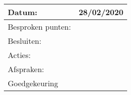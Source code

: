 \begin{tabularx}{\textwidth}{| l | X |}
  \hline
  Datum: & 28/02/2020\\
  \hline
  Besproken punten: & \\
  \hline
  Besluiten: & \\
  Acties: & \\
  Afspraken: & \\
  \hline
  Goedgekeuring & \\
  \hline
\end{tabularx}